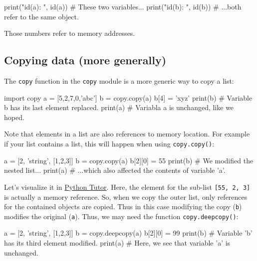 \documentclass[12pt]{article} \newif\ifsolution\solutiontrue %
\begin{document}
\begin{python}
print("id(a): ", id(a))   # These two variables...
print("id(b): ", id(b))   # ...both refer to the same object.
\end{python}

Those numbers refer to memory addresses.

\subsection{Copying data (more
generally)}\label{copying-data-more-generally}

The \texttt{copy} function in the \texttt{copy} module is a more generic
way to copy a list:

\begin{python}
import copy
a = [5,2,7,0,'abc']
b = copy.copy(a)
b[4] = 'xyz'
print(b)  # Variable b has its last element replaced.
print(a)  # Variabla a is unchanged, like we hoped.
\end{python}

Note that elements in a list are also references to memory location. For example if your list contains a list, this will happen when using
\texttt{copy.copy()}:

\begin{python}
a = [2, 'string', [1,2,3]]
b = copy.copy(a)
b[2][0] = 55
print(b)  # We modified the nested list...
print(a)  # ...which also affected the contents of variable 'a'.
\end{python}

Let's visualize it in \href{http://www.pythontutor.com/visualize.html#code=import%20copy%0Aa%20%3D%20%5B2,%20'string',%20%5B1,2,3%5D%5D%0Ab%20%3D%20copy.copy%28a%29%0Ab%5B2%5D%5B0%5D%20%3D%2055%0Aprint%28b%29%20%20%23%20We%20modified%20the%20nested%20list...%0Aprint%28a%29%20%20%23%20...which%20also%20affected%20the%20contents%20of%20variable%20'a'.%0A&cumulative=false&curInstr=0&heapPrimitives=nevernest&mode=display&origin=opt-frontend.js&py=3&rawInputLstJSON=%5B%5D&textReferences=false}{Python Tutor}. Here, the element for the sub-list \texttt{{[}55,\ 2,\ 3{]}} is actually
a memory reference. So, when we copy the outer list, only references for
the contained objects are copied. Thus in this case modifying the copy
(\texttt{b}) modifies the original (\texttt{a}). Thus, we may need the
function \texttt{copy.deepcopy()}:

\begin{python}
a = [2, 'string', [1,2,3]]
b = copy.deepcopy(a)
b[2][0] = 99
print(b)  # Variable 'b' has its third element modified.
print(a)  # Here, we see that variable 'a' is unchanged.
\end{python}
\end{document}
